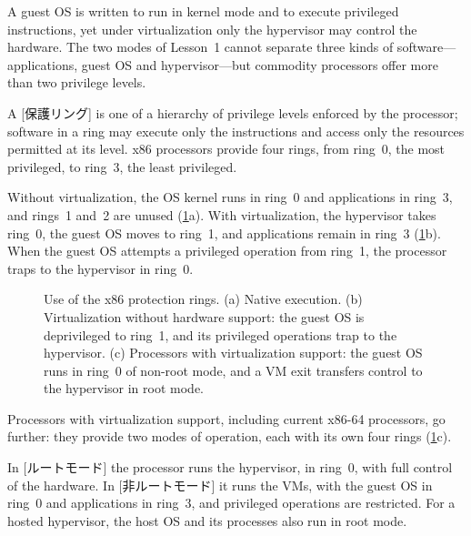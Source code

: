 \documentclass[../main.tex]{subfiles}
\begin{document}
A guest OS is written to run in kernel mode and to execute privileged
instructions, yet under virtualization only the hypervisor may control the
hardware.  The two modes of Lesson~1 cannot separate three kinds of
software---applications, guest OS and hypervisor---but commodity processors
offer more than two privilege levels.

\begin{definition}
  A [保護リング] is one of a hierarchy of privilege
  levels enforced by the processor; software in a ring may execute only
  the instructions and access only the resources permitted at its level.
  x86 processors provide four rings, from ring~0, the most privileged, to
  ring~3, the least privileged.
\end{definition}

Without virtualization, the OS kernel runs in ring~0 and applications in
ring~3, and rings~1 and~2 are unused (\cref{fig:l12-rings}a).  With
virtualization, the hypervisor takes ring~0, the guest OS moves to ring~1,
and applications remain in ring~3 (\cref{fig:l12-rings}b).  When the guest
OS attempts a privileged operation from ring~1, the processor traps to the
hypervisor in ring~0.

\begin{figure}[htbp]
  \centering
  
  \caption{Use of the x86 protection rings.  (a) Native execution.
    (b) Virtualization without hardware support: the guest OS is
    deprivileged to ring~1, and its privileged operations trap to the
    hypervisor.  (c) Processors with virtualization support: the guest OS
    runs in ring~0 of non-root mode, and a VM exit transfers control to
    the hypervisor in root mode.}
  \label{fig:l12-rings}
\end{figure}

Processors with virtualization support, including current x86-64
processors, go further: they provide two modes of operation, each with its
own four rings (\cref{fig:l12-rings}c).

\begin{definition}
  In [ルートモード] the processor runs the hypervisor, in
  ring~0, with full control of the hardware.  In
  [非ルートモード] it runs the VMs, with the guest OS
  in ring~0 and applications in ring~3, and privileged operations are
  restricted.  For a hosted hypervisor, the host OS and its processes also
  run in root mode.
\end{definition}
\end{document}
